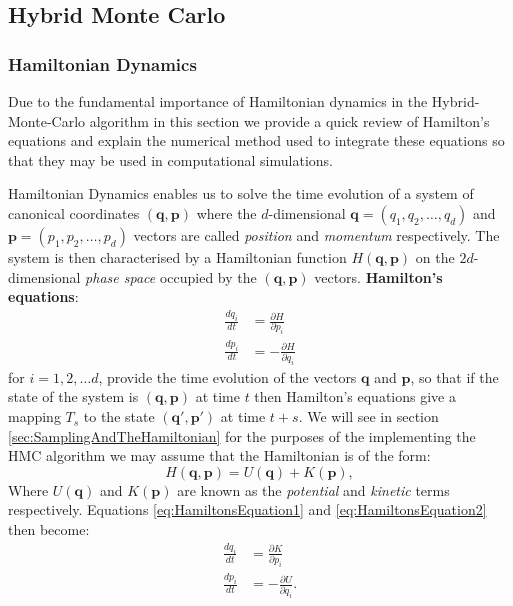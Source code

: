 \documentclass[12pt]{article}
\begin{document}
    \subsection{Hybrid Monte Carlo}
        \subsubsection{Hamiltonian Dynamics}
            \label{sec:HamiltonianDynamics}
            Due to the fundamental importance of Hamiltonian dynamics in the Hybrid-Monte-Carlo algorithm in this section we provide a quick review of Hamilton's equations and explain the numerical method used to integrate these equations so that they may be used in computational simulations.

            Hamiltonian Dynamics enables us to solve the time evolution of a system of canonical coordinates $\left(\bm{q},\bm{p}\right)$ where the $d$-dimensional $\bm{q}=\left(q_1,q_2,\dots,q_d\right)$ and $\bm{p}=\left(p_1,p_2,\dots,p_d\right)$ vectors are called \textit{position} and \textit{momentum} respectively. The system is then characterised by a Hamiltonian function $H\left(\bm{q},\bm{p}\right)$ on the $2d$-dimensional \textit{phase space} occupied by the $\left(\bm{q},\bm{p}\right)$ vectors. \textbf{Hamilton's equations}:
            \begin{align}
                \label{eq:HamiltonsEquation1} \frac{dq_i}{dt} & = \frac{\partial H}{\partial p_i} \\
                \label{eq:HamiltonsEquation2} \frac{dp_i}{dt} & = -\frac{\partial H}{\partial q_i}
            \end{align}
            for $i = 1, 2, \dots d$, provide the time evolution of the vectors $\bm{q}$ and $\bm{p}$, so that if the state of the system is $\left(\bm{q},\bm{p}\right)$ at time $t$ then Hamilton's equations give a mapping $T_s$ to the state $\left(\bm{q}',\bm{p}'\right)$ at time $t+s$.  We will see in section \ref{sec:SamplingAndTheHamiltonian} for the purposes of the implementing the HMC algorithm we may assume that the Hamiltonian is of the form:
            \begin{equation}
                \label{eq:HamiltonianUPlusK}
                H\left(\bm{q},\bm{p}\right) = U\left(\bm{q}\right) + K\left(\bm{p}\right),
            \end{equation}
            Where $U\left(\bm{q}\right)$ and $K\left(\bm{p}\right)$ are known as the \textit{potential} and \textit{kinetic} terms respectively. Equations \ref{eq:HamiltonsEquation1} and \ref{eq:HamiltonsEquation2} then become:
            \begin{align}
                \label{eq:HamiltonsEquation1K} \frac{dq_i}{dt} & = \frac{\partial K}{\partial p_i} \\
                \label{eq:HamiltonsEquation2T} \frac{dp_i}{dt} & = -\frac{\partial U}{\partial q_i}.
            \end{align}
\end{document}

